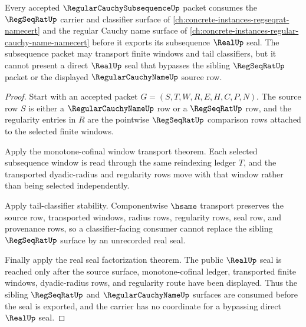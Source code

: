 \begin{theorem}
\label{thm:regular-cauchy-subsequence-regseqrat-sibling-consumption}
Every accepted $\RegularCauchySubsequenceUp$ packet consumes the $\RegSeqRatUp$ carrier and classifier surface of \autoref{ch:concrete-instances-regseqrat-namecert} and the regular Cauchy name surface of \autoref{ch:concrete-instances-regular-cauchy-name-namecert} before it exports its subsequence $\RealUp$ seal. The subsequence packet may transport finite windows and tail classifiers, but it cannot present a direct $\RealUp$ seal that bypasses the sibling $\RegSeqRatUp$ packet or the displayed $\RegularCauchyNameUp$ source row.
\end{theorem}
\begin{proof}
Start with an accepted packet $G=(S,T,W,R,E,H,C,P,N)$. The source row $S$ is either a $\RegularCauchyNameUp$ row or a $\RegSeqRatUp$ row, and the regularity entries in $R$ are the pointwise $\RegSeqRatUp$ comparison rows attached to the selected finite windows.

Apply the monotone-cofinal window transport theorem. Each selected subsequence window is read through the same reindexing ledger $T$, and the transported dyadic-radius and regularity rows move with that window rather than being selected independently.

Apply tail-classifier stability. Componentwise $\hsame$ transport preserves the source row, transported windows, radius rows, regularity rows, seal row, and provenance rows, so a classifier-facing consumer cannot replace the sibling $\RegSeqRatUp$ surface by an unrecorded real seal.

Finally apply the real seal factorization theorem. The public $\RealUp$ seal is reached only after the source surface, monotone-cofinal ledger, transported finite windows, dyadic-radius rows, and regularity route have been displayed. Thus the sibling $\RegSeqRatUp$ and $\RegularCauchyNameUp$ surfaces are consumed before the seal is exported, and the carrier has no coordinate for a bypassing direct $\RealUp$ seal.
\end{proof}

